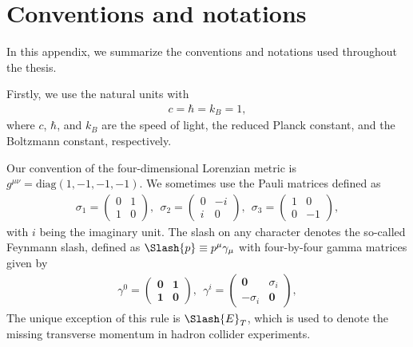 \documentclass[12pt,twoside,book]{article}
\begin{document}
\section{Conventions and notations}
\label{sec:convention}

\vskip 0.1in

In this appendix, we summarize the conventions and notations used throughout the thesis.

Firstly, we use the natural units with
\begin{align}
  c = \hbar = k_B = 1,
\end{align}
where $c$, $\hbar$, and $k_B$ are the speed of light, the reduced Planck constant, and the Boltzmann constant, respectively.

Our convention of the four-dimensional Lorenzian metric is $g^{\mu \nu} = \mathrm{diag} (1, -1, -1, -1)$.
We sometimes use the Pauli matrices defined as
\begin{align}
  \sigma_1 =
  \begin{pmatrix}
    0 & 1\\
    1 & 0
  \end{pmatrix},
  ~~
  \sigma_2 =
  \begin{pmatrix}
    0 & -i\\
    i & 0
  \end{pmatrix},
  ~~
  \sigma_3 =
  \begin{pmatrix}
    1 & 0\\
    0 & -1
  \end{pmatrix},
\end{align}
with $i$ being the imaginary unit.
The slash on any character denotes the so-called Feynmann slash, defined as $\Slash{p} \equiv p^\mu \gamma_\mu$ with four-by-four gamma matrices given by
\begin{align}
  \gamma^0 =
  \begin{pmatrix}
    \bm{0} & \bm{1}\\
    \bm{1} & \bm{0}
  \end{pmatrix},
  ~~
  \gamma^i =
  \begin{pmatrix}
    \bm{0} & \sigma_i\\
    -\sigma_i & \bm{0}
  \end{pmatrix},
\end{align}
The unique exception of this rule is $\Slash{E}_T$, which is used to denote the missing transverse momentum in hadron collider experiments.
\end{document}
